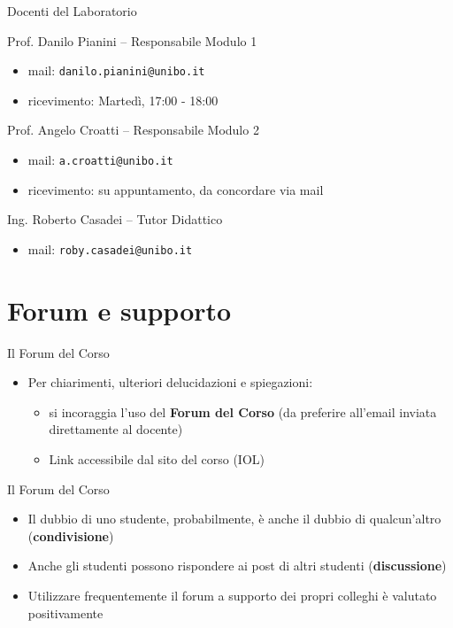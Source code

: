 \documentclass[presentation]{beamer}
\begin{document}
\begin{frame}{Docenti del Laboratorio}

\begin{block}{Prof. Danilo Pianini -- Responsabile Modulo 1}
\begin{itemize}
\item mail: \texttt{danilo.pianini@unibo.it}
\item ricevimento: Martedì, 17:00 - 18:00
\end{itemize}
\end{block}

\begin{block}{Prof. Angelo Croatti -- Responsabile Modulo 2}
\begin{itemize}
\item mail: \texttt{a.croatti@unibo.it}
\item ricevimento: su appuntamento, da concordare via mail
\end{itemize}
\end{block}

\begin{block}{Ing. Roberto Casadei -- Tutor Didattico}
\begin{itemize}
\item mail: \texttt{roby.casadei@unibo.it}
\end{itemize}
\end{block}

\end{frame}

\section{Forum e supporto}

\begin{frame}{Il Forum del Corso}

\begin{itemize}
\item Per chiarimenti, ulteriori delucidazioni e spiegazioni:
\begin{itemize}
\item si incoraggia l'uso del \textbf{Forum del Corso} (da preferire all'email inviata direttamente al docente)
\item Link accessibile dal sito del corso (IOL)
\end{itemize}
\end{itemize}

\begin{block}{Il Forum del Corso}
\begin{itemize}
\item Il dubbio di uno studente, probabilmente, è anche il dubbio di qualcun'altro (\textbf{condivisione}) 
\item Anche gli studenti possono rispondere ai post di altri studenti (\textbf{discussione})
\item Utilizzare frequentemente il forum a supporto dei propri colleghi è valutato positivamente
\end{itemize}
\end{block}

\end{frame}
\end{document}

